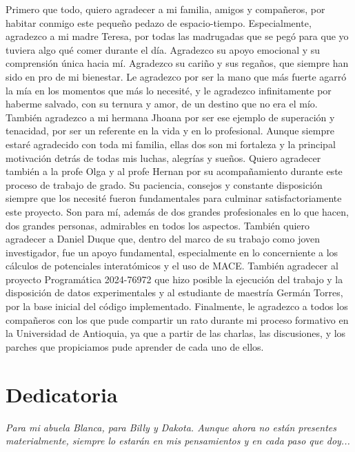 \documentclass[12pt,letterpaper,oneside]{report}
\begin{document}
Primero que todo, quiero agradecer a mi familia, amigos y compañeros, por habitar conmigo este pequeño pedazo de espacio-tiempo. Especialmente, agradezco a mi madre Teresa, por todas las madrugadas que se pegó para que yo tuviera algo qué comer durante el día. Agradezco su apoyo emocional y su comprensión única hacia mí. Agradezco su cariño y sus regaños, que siempre han sido en pro de mi bienestar. Le agradezco por ser la mano que más fuerte agarró la mía en los momentos que más lo necesité, y le agradezco infinitamente por haberme salvado, con su ternura y amor, de un destino que no era el mío. También agradezco a mi hermana Jhoana por ser ese ejemplo de superación y tenacidad, por ser un referente en la vida y en lo profesional. Aunque siempre estaré agradecido con toda mi familia, ellas dos son mi fortaleza y la principal motivación detrás de todas mis luchas, alegrías y sueños. Quiero agradecer también a la profe Olga y al profe Hernan por su acompañamiento durante este proceso de trabajo de grado. Su paciencia, consejos y constante disposición siempre que los necesité fueron fundamentales para culminar satisfactoriamente este proyecto. Son para mí, además de dos grandes profesionales en lo que hacen, dos grandes personas, admirables en todos los aspectos. También quiero agradecer a Daniel Duque que, dentro del marco de su trabajo como joven investigador, fue un apoyo fundamental, especialmente en lo concerniente a los cálculos de potenciales interatómicos y el uso de MACE. También agradecer al proyecto Programática 2024-76972 que hizo posible la ejecución del trabajo y la disposición de datos experimentales y al estudiante de maestría Germán Torres, por la base inicial del código implementado. Finalmente, le agradezco a todos los compañeros con los que pude compartir un rato durante mi proceso formativo en la Universidad de Antioquia, ya que a partir de las charlas, las discusiones, y los parches que propiciamos pude aprender de cada uno de ellos.

\newpage
\chapter*{Dedicatoria}
\vspace*{3cm}
\begin{flushright}
    \textit{Para mi abuela Blanca, para Billy y Dakota. Aunque ahora no están presentes materialmente, siempre lo estarán en mis pensamientos y en cada paso que doy...}
\end{flushright}
\end{document}
